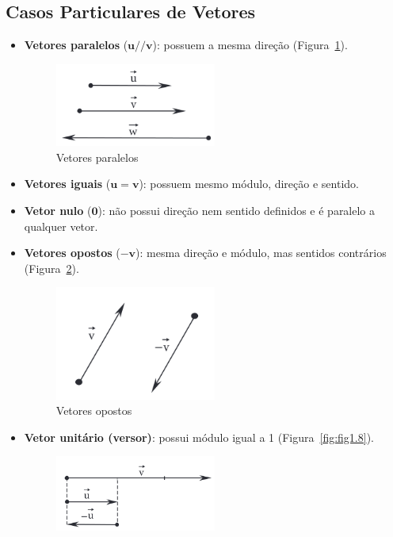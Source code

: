 \subsection{Casos Particulares de Vetores}
\begin{itemize}
    \item \textbf{Vetores paralelos} ($\mathbf{u} // \mathbf{v}$): possuem a
    mesma direção (Figura~\ref{fig:fig1.6}).
    \begin{figure}[H]
        \centering
        \includegraphics[width=0.5\textwidth]{./fig/fig1.6.png}
        \caption{Vetores paralelos}\label{fig:fig1.6}
    \end{figure}
    \item \textbf{Vetores iguais} ($\mathbf{u} = \mathbf{v}$): possuem mesmo
    módulo, direção e sentido.
    \item \textbf{Vetor nulo} ($\mathbf{0}$): não possui direção nem sentido
    definidos e é paralelo a qualquer vetor.
    \item \textbf{Vetores opostos} ($-\mathbf{v}$): mesma direção e módulo, mas
    sentidos contrários (Figura~\ref{fig:fig1.7}).
    \begin{figure}[H]
        \centering
        \includegraphics[width=0.5\textwidth]{./fig/fig1.7.png}
        \caption{Vetores opostos}\label{fig:fig1.7}
    \end{figure}
    \item \textbf{Vetor unitário (versor)}: possui módulo igual a 1
      (Figura~\ref{fig:fig1.8}).
    \begin{figure}[H]
        \centering
        \includegraphics[width=0.5\textwidth]{./fig/fig1.8.png}

\end{figure}
\end{itemize}
